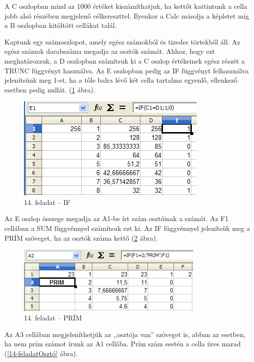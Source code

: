 A C oszlopban mind az 1000 értéket kiszámíthatjuk, ha kettőt
kattintunk a cella jobb alsó részében megjelenő
célkereszttel. Ilyenkor a Calc másolja a képletet míg a B
oszlopban kitöltött cellákat talál.

Kaptunk egy számoszlopot, amely egész számokból és tizedes
törtekből áll. Az egész számok darabszáma megadja az
osztók számát. Ahhoz, hogy ezt meghatározzuk, a D oszlopban
számítsuk ki a C oszlop értékeinek egész részét a TRUNC
függvényt használva. Az E oszlopban pedig az IF függvényt
felhasználva jelenítsünk meg 1-et, ha a tőle balra lévő
két cella tartalma egyenlő, ellenkező esetben pedig nullát.
(\ref{14-feladatIF} ábra).

\begin{figure}[!h]
\begin{center}
\includegraphics[width=9.338cm]{oocalcv1-img78.png}
\caption{14. feladat -- IF}\label{14-feladatIF}
\end{center}
\end{figure}

Az E oszlop összege megadja az A1-be írt szám osztóinak a
számát. Az F1 cellában a SUM függvénnyel számítsuk ezt
ki. Az IF függvénnyel jelenítsük meg a PRÍM szöveget, ha az
osztók száma kettő (\ref{14-feladatPrím} ábra).

\begin{figure}[!h]
\begin{center}
\includegraphics[width=9.158cm]{oocalcv1-img79.png}
\caption{14. feladat -- PRÍM}\label{14-feladatPrím}
\end{center}
\end{figure}

Az A3 cellában megjeleníthetjük az ,,osztója
van'' szöveget is, abban az esetben, ha nem prím
számot írunk az A1 cellába. Prím szám esetén a cella üres
marad (\ref{14-feladatOsztó} ábra).


